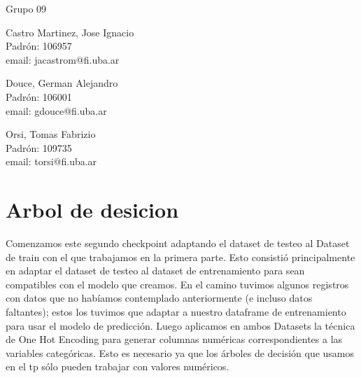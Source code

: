 \documentclass{article}
\begin{document}
\begin{titlepage}
  \vspace{0.4cm}
  \begin{center}
    {\Large{Grupo 09}}\\
    \vspace{0.6cm}
    {\begin{minipage}[t]{.32\textwidth}
        \begin{center}
	Castro  Martinez, Jose Ignacio\\
          {\small{Padrón: 106957}}\\
          {\small{email: jacastrom@fi.uba.ar}}
        \end{center}
	\end{minipage}
	\begin{minipage}[t]{.32\textwidth}
        \begin{center}
	Douce, German Alejandro\\
          {\small{Padrón: 106001}}\\
          {\small{email: gdouce@fi.uba.ar}}\\
        \end{center}
      \end{minipage}
      \begin{minipage}[t]{.32\textwidth}
        \begin{center}
          Orsi, Tomas Fabrizio\\
          {\small{Padrón: 109735}}\\
          {\small{email: torsi@fi.uba.ar}}
        \end{center}
      \end{minipage}}
  \end{center}
\end{titlepage}

\section*{Arbol de desicion}
Comenzamos este segundo checkpoint adaptando el dataset de testeo al Dataset de train con el que trabajamos en la primera parte. Esto consistió principalmente en adaptar el dataset de testeo al dataset de entrenamiento para sean compatibles con el modelo que creamos. En el camino tuvimos algunos registros con datos que no habíamos contemplado anteriormente (e incluso datos faltantes); estos los tuvimos que adaptar a nuestro dataframe de entrenamiento para usar el modelo de predicción. Luego aplicamos en ambos Datasets la técnica de One Hot Encoding para generar columnas numéricas correspondientes a las variables categóricas. Esto es necesario ya que los árboles de decisión que usamos en el tp sólo pueden trabajar con valores numéricos.
\end{document}

